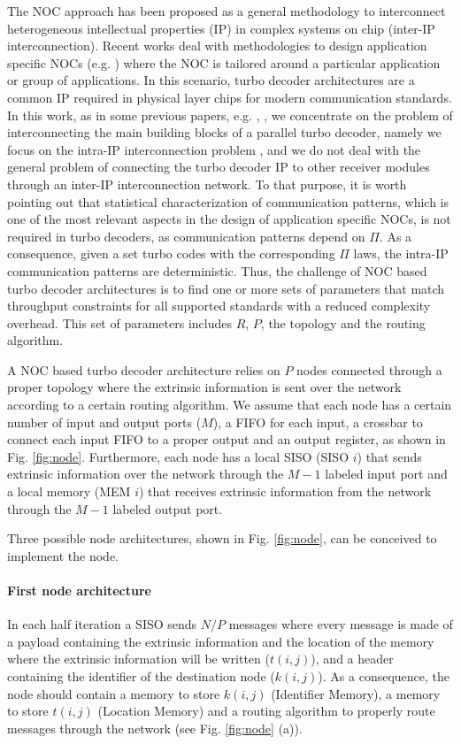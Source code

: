 \documentclass[10pt,twocolumn,journal]{IEEEtran}
\begin{document}
The NOC approach \cite{beniniNOC} has been proposed as a general methodology to interconnect heterogeneous 
intellectual properties (IP) in complex systems on chip (inter-IP interconnection). 
Recent works deal with methodologies to design application specific NOCs (e.g. \cite{benini_date06}) 
where the NOC is tailored around a particular application or group of applications. 
In this scenario, turbo decoder architectures are a common IP required in physical layer chips for modern communication 
standards. 
In this work, as in some previous papers, e.g. \cite{wehn_icecs02}, \cite{wehn_iscas05}, \cite{moussa_iscas08} 
we concentrate on the problem of interconnecting the main building blocks of a parallel 
turbo decoder, namely 
we focus on the intra-IP interconnection problem \cite{vacca_DSD09}, and we do not deal with the general problem of connecting the 
turbo decoder IP to other receiver modules through an inter-IP interconnection network. 
To that purpose, it is worth pointing out that statistical characterization of 
communication patterns, which is one of the most relevant aspects in the design of application specific NOCs, 
is not required in turbo decoders, as communication patterns depend on $\Pi$.
As a consequence, given a set turbo codes with the corresponding $\Pi$ laws, the intra-IP communication patterns are 
deterministic. Thus, the challenge of NOC based turbo decoder architectures is to find one or more sets of parameters that
match throughput constraints for all supported standards 
with a reduced complexity overhead. This set of parameters includes 
$R$, $P$, the topology and the routing algorithm. 

A NOC based turbo decoder architecture relies on $P$ nodes connected through a proper topology where the 
extrinsic information is sent over the network according to a certain routing algorithm. We assume that 
each node has a certain number of input and output ports ($M$), 
a FIFO for each input, 
a crossbar to connect each input FIFO to a proper output 
and an output register, as shown in Fig. \ref{fig:node}. 
Furthermore, each node has a local SISO (SISO $i$) that sends extrinsic information over the network through 
the $M-1$ labeled input port and a local memory (MEM $i$) that receives extrinsic information from the network 
through the $M-1$ labeled output port. 

Three possible node architectures, shown in Fig. \ref{fig:node}, can be conceived to implement the node. 
\paragraph{First node architecture}
In each half iteration a SISO sends $N/P$ messages where every message is made of a payload containing 
the extrinsic information and the location of the memory where the extrinsic information will be written ($t(i,j)$), and 
a header containing the identifier of the destination node ($k(i,j)$). 
As a consequence, the node should contain a memory to store $k(i,j)$ (Identifier Memory),
a memory to store $t(i,j)$ (Location Memory) and a routing algorithm to properly route messages through 
the network (see Fig. \ref{fig:node} (a)).
\end{document}
